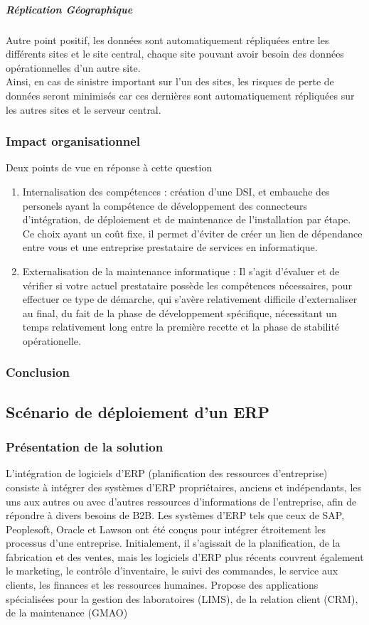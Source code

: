 \subparagraph{Réplication Géographique}
Autre point positif, les données sont automatiquement répliquées entre les différents sites et le site central, chaque site pouvant avoir besoin des données opérationnelles d'un autre site.\\
Ainsi, en cas de sinistre important sur l'un des sites, les risques de perte de données seront minimisés car ces dernières sont automatiquement répliquées sur les autres sites et le serveur central.

\subsubsection{Impact organisationnel}

Deux points de vue en réponse à cette question\\
\begin{enumerate}
\item Internalisation des compétences : création d'une DSI, et embauche des personels ayant la compétence de développement des connecteurs d'intégration, de déploiement et de maintenance de l'installation par étape. Ce choix ayant un coût fixe, il permet d'éviter de créer un lien de dépendance entre vous et une entreprise prestataire de services en informatique.
\item Externalisation de la maintenance informatique : Il s'agit d'évaluer et de vérifier si votre actuel prestataire possède les compétences nécessaires, pour effectuer ce type de démarche, qui s'avère relativement difficile d'externaliser au final, du fait de la phase de développement spécifique, nécessitant un temps relativement long entre la première recette et la phase de stabilité opérationelle.
\end{enumerate}

\subsubsection{Conclusion}



\subsection{Scénario de déploiement d'un ERP}

\subsubsection{Présentation de la solution}
L’intégration de logiciels d’ERP (planification des ressources d’entreprise) consiste à intégrer des systèmes d’ERP propriétaires, anciens et indépendants, les uns aux autres ou avec d’autres ressources d’informations de l’entreprise, afin de répondre à divers besoins de B2B. Les systèmes d’ERP tels que ceux de SAP, Peoplesoft, Oracle et Lawson ont été conçus pour intégrer étroitement les processus d’une entreprise. Initialement, il s’agissait de la planification, de la fabrication et des ventes, mais les logiciels d’ERP plus récents couvrent également le marketing, le contrôle d’inventaire, le suivi des commandes, le service aux clients, les finances et les ressources humaines.
Propose des applications spécialisées pour la gestion des laboratoires (LIMS), de la relation client (CRM), de la maintenance (GMAO)
